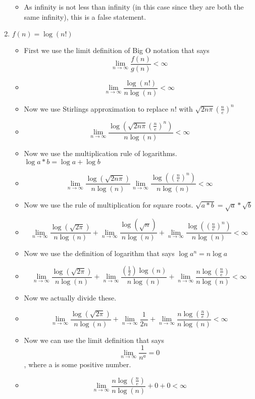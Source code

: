 \begin{enumerate}
\begin{itemize}
  \item As infinity is not less than infinity (in this case since they are both the same infinity), this is a false statement.
  \end{itemize}
\item $f(n) = \log{(n!)}$
  \begin{itemize}
  \item First we use the limit definition of Big O notation that says $$\lim_{n \to \infty} \frac{f(n)}{g(n)} < \infty$$
  \item {\Large $$\lim_{n \to \infty} \frac{\log{(n!)}}{n\log{(n)}} <\infty$$}
  \item Now we use Stirlings approximation to replace $n!$ with $\sqrt{2n\pi}\left(\frac{n}{e}\right)^{n}$
  \item {\Large $$\lim_{n \to \infty} \frac{\log{(\sqrt{2n\pi}\left(\frac{n}{e}\right)^{n})}}{n\log{(n)}} <\infty$$}
  \item Now we use the multiplication rule of logarithms. $\log{a*b} = \log{a} + \log{b}$
  \item {\Large $$\lim_{n \to \infty} \frac{\log{(\sqrt{2n\pi})}}{n\log{(n)}} \lim_{n \to \infty} \frac{\log{(\left(\frac{n}{e}\right)^{n})}}{n\log{(n)}} <\infty$$}
  \item Now we use the rule of multiplication for square roots. $\sqrt{a*b} = \sqrt{a}*\sqrt{b}$
  \item {\Large $$\lim_{n \to \infty} \frac{\log{(\sqrt{2\pi})}}{n\log{(n)}} + \lim_{n \to \infty} \frac{\log{(\sqrt{n})}}{n\log{(n)}} + \lim_{n \to \infty} \frac{\log{(\left(\frac{n}{e}\right)^{n})}}{n\log{(n)}} <\infty$$}
  \item Now we use the definition of logarithm that says $\log{a^{n}} = n\log{a}$
  \item {\Large $$\lim_{n \to \infty} \frac{\log{(\sqrt{2\pi})}}{n\log{(n)}} + \lim_{n \to \infty} \frac{(\frac{1}{2})\log{(n)}}{n\log{(n)}} + \lim_{n \to \infty} \frac{n\log{(\frac{n}{e})}}{n\log{(n)}} <\infty$$}
  \item Now we actually divide these.
  \item {\Large $$\lim_{n \to \infty} \frac{\log{(\sqrt{2\pi})}}{n\log{(n)}} + \lim_{n \to \infty} \frac{1}{2n} + \lim_{n \to \infty} \frac{n\log{(\frac{n}{e})}}{n\log{(n)}} <\infty$$}
  \item Now we can use the limit definition that says $$\lim_{n \to \infty} \frac{1}{n^{a}} = 0$$, where a is some positive number.
  \item {\Large $$\lim_{n \to \infty} \frac{n\log{(\frac{n}{e})}}{n\log{(n)}} + 0 + 0 <\infty$$}

\end{itemize}
\end{enumerate}
